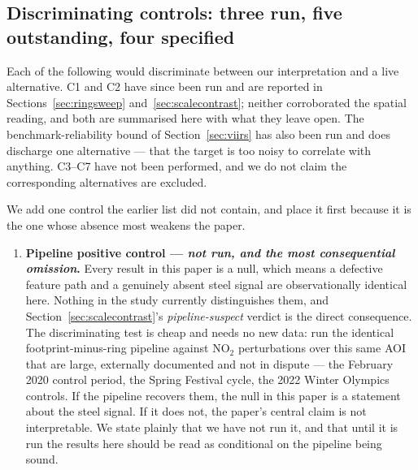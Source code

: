 \documentclass[11pt,a4paper]{article}
\providecommand{\ce}[1]{\ensuremath{\mathrm{#1}}}
\begin{document}
\subsection{Discriminating controls: three run, five outstanding, four specified}
\label{sec:notrun}

Each of the following would discriminate between our interpretation and a live alternative. C1 and
C2 have since been run and are reported in Sections~\ref{sec:ringsweep}
and~\ref{sec:scalecontrast}; neither corroborated the spatial reading, and both are summarised here
with what they leave open. The benchmark-reliability bound of Section~\ref{sec:viirs} has also been
run and does discharge one alternative --- that the target is too noisy to correlate with anything.
C3--C7 have not been performed, and we do not claim the corresponding alternatives are excluded.

We add one control the earlier list did not contain, and place it first because it is the one whose
absence most weakens the paper.

\begin{enumerate}[leftmargin=1.6em,itemsep=0.3em,label=\textbf{C0.}]
  \item \textbf{Pipeline positive control --- \emph{not run, and the most consequential omission}.}
  Every result in this paper is a null, which means a defective feature path and a genuinely absent
  steel signal are observationally identical here. Nothing in the study currently distinguishes
  them, and Section~\ref{sec:scalecontrast}'s \emph{pipeline-suspect} verdict is the direct
  consequence. The discriminating test is cheap and needs no new data: run the identical
  footprint-minus-ring pipeline against \ce{NO_2} perturbations over this same AOI that are large,
  externally documented and not in dispute --- the February 2020 control period, the Spring
  Festival cycle, the 2022 Winter Olympics controls. If the pipeline recovers them, the null in
  this paper is a statement about the steel signal. If it does not, the paper's central claim is
  not interpretable. We state plainly that we have not run it, and that until it is run the results
  here should be read as conditional on the pipeline being sound.
\end{enumerate}
\end{document}
